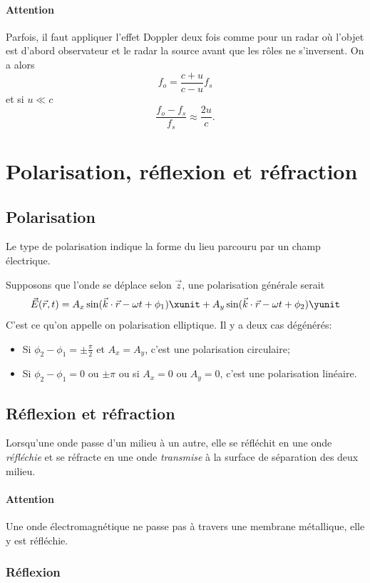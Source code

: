 \paragraph{Attention} Parfois, il faut appliquer l'effet Doppler deux fois
comme pour un radar où l'objet est d'abord observateur et le radar la source
avant que les rôles ne s'inversent.
On a alors
\[ f_o = \frac{c + u}{c - u}f_s \]
et si $u \ll c$
\[ \frac{f_o - f_s}{f_s} \approx \frac{2u}{c}. \]

\section{Polarisation, réflexion et réfraction}

\subsection{Polarisation}
Le type de polarisation indique la forme du lieu parcouru
par un champ électrique.

Supposons que l'onde se déplace selon $\vec{z}$, 
une polarisation générale serait
\[ \vec{E}(\vec{r}, t) = A_x \sin(\vec{k}\cdot\vec{r} - \omega t + \phi_1)
  \xunit
+ A_y \sin(\vec{k} \cdot \vec{r} - \omega t + \phi_2) \yunit \]
C'est ce qu'on appelle on polarisation elliptique.
Il y a deux cas dégénérés:
\begin{itemize}
  \item Si $\phi_2-\phi_1 = \pm \frac{\pi}{2}$
    et $A_x = A_y$, c'est une polarisation circulaire;
  \item Si $\phi_2-\phi_1 = 0$ ou $\pm\pi$ ou si $A_x = 0$ ou $A_y = 0$,
    c'est une polarisation linéaire.
\end{itemize}

\subsection{Réflexion et réfraction}
Lorsqu'une onde passe d'un milieu à un autre,
elle se réfléchit en une onde \emph{réfléchie} et se réfracte en une onde
\emph{transmise} à la surface de séparation des deux milieu.

\paragraph{Attention}
Une onde électromagnétique ne passe pas à travers une membrane métallique, 
elle y est réfléchie.

\subsubsection{Réflexion}

